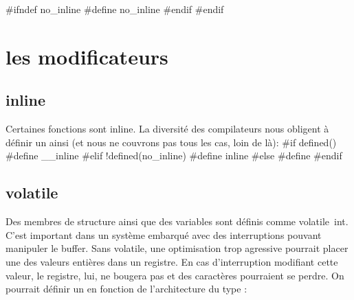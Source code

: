 \documentclass{scrartcl}%
\begin{document}
#ifndef no_inline
  #define no_inline
#endif
#endif
\nwendcode{}\nwdocspar
\section{les modificateurs}
\subsection{inline}
Certaines fonctions sont {\Tt{}inline\nwendquote}. La diversité des compilateurs nous obligent à définir un {\Tt{}\nwendquote} ainsi (et nous ne couvrons pas tous les cas, loin de là):
\nwenddocs{}\endmoddef\nwstartdeflinemarkup{}\nwenddeflinemarkup
#if defined()
        #define  __inline
#elif !defined(no_inline)
        #define  inline
#else
        #define 
#endif
\eatline
{}\nwendcode{}\subsection{volatile}
Des membres de structure ainsi que des variables sont définis comme {\Tt{}volatile\ int\nwendquote}. C'est important dans un système embarqué avec des interruptions pouvant manipuler le buffer. Sans {\Tt{}volatile\nwendquote}, une optimisation trop agressive pourrait placer une des valeurs entières dans un registre. En cas d'interruption modifiant cette valeur, le registre, lui, ne bougera pas et des caractères pourraient se perdre.
On pourrait définir un {\Tt{}\nwendquote} en fonction de l'architecture du type :
\end{document}

